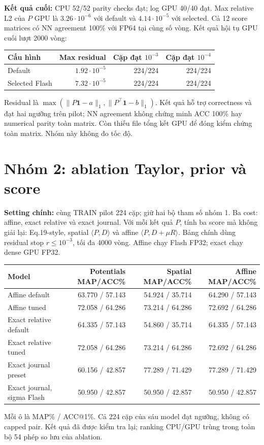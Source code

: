\documentclass[11pt,a4paper]{article}
\begin{document}
\textbf{Kết quả cuối:} CPU 52/52 parity checks đạt; log GPU 40/40 đạt.
Max relative L2 của $P$ GPU là $3.26\cdot10^{-6}$ với default và
$4.14\cdot10^{-5}$ với selected. Cả 12 score matrices có NN agreement
100\% với FP64 tại cùng số vòng. Kết quả hội tụ GPU cuối lượt 2000 vòng:
\begin{center}\small
\begin{tabular}{@{}lrrr@{}}
\toprule
Cấu hình & Max residual & Cặp đạt $10^{-3}$ & Cặp đạt $10^{-4}$ \\
\midrule
Default & $1.92\cdot10^{-5}$ & 224/224 & 224/224 \\
Selected Flash & $7.32\cdot10^{-5}$ & 224/224 & 224/224 \\
\bottomrule
\end{tabular}
\end{center}
Residual là $\max(\|P\mathbf1-a\|_1,\|P^\top\mathbf1-b\|_1)$.
Kết quả hỗ trợ correctness và đạt hai ngưỡng trên pilot;
NN agreement không chứng minh ACC 100\% hay numerical parity toàn matrix.
Còn thiếu file tổng kết GPU để đóng kiểm chứng toàn matrix. Nhóm này không đo tốc độ.

\section{Nhóm 2: ablation Taylor, prior và score}
\label{sec:g2}
\textbf{Setting chính:} cùng TRAIN pilot 224 cặp; giữ hai bộ tham số nhóm 1.
Ba cost: affine, exact relative và exact journal. Với mỗi kết quả $P$,
tính ba score mà không giải lại: Eq.19-style, spatial $\langle P,D\rangle$
và affine $\langle P,D+\mu R\rangle$. Bảng chính dùng residual stop
$r\leq10^{-3}$, tối đa 4000 vòng. Affine chạy Flash FP32; exact chạy dense GPU FP32.
\begin{center}\small
\begin{tabular}{@{}lrrr@{}}
\toprule
Model & Potentials MAP/ACC\% & Spatial MAP/ACC\% & Affine MAP/ACC\% \\
\midrule
Affine default & 63.770 / 57.143 & 54.924 / 35.714 & 64.290 / 57.143 \\
Affine tuned & 72.058 / 64.286 & 73.214 / 64.286 & 72.692 / 64.286 \\
Exact relative default & 64.335 / 57.143 & 54.860 / 35.714 & 64.335 / 57.143 \\
Exact relative tuned & 72.058 / 64.286 & 73.214 / 64.286 & 72.692 / 64.286 \\
Exact journal preset & 60.156 / 42.857 & 77.289 / 71.429 & 77.289 / 71.429 \\
Exact journal, sigma Flash & 50.950 / 42.857 & 50.950 / 42.857 & 50.950 / 42.857 \\
\bottomrule
\end{tabular}
\end{center}
Mỗi ô là MAP\% / ACC@1\%. Cả 224 cặp của sáu model đạt ngưỡng,
không có capped pair. Kết quả đã được kiểm tra lại; ranking CPU/GPU trùng
trong toàn bộ 54 phép so lưu của ablation.
\end{document}
